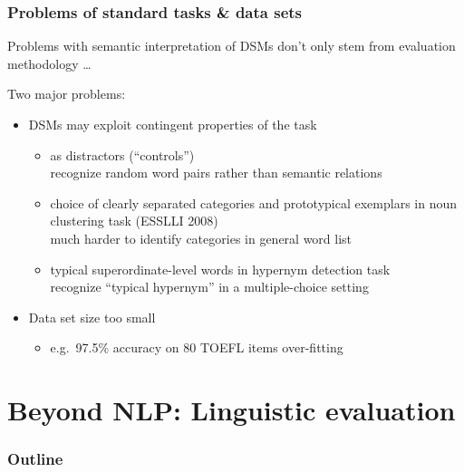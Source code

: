 \documentclass[t]{beamer} %
\begin{document}
\begin{frame}
  \frametitle{Problems of standard tasks \& data sets}

  Problems with semantic interpretation of DSMs don't only stem from evaluation methodology \ldots\\
  \hfill {} 
  
  \gap[1]
  Two major problems:
  \begin{itemize}
  \item DSMs may exploit contingent properties of the task
    \begin{itemize}
    \item {} as distractors (``controls'')\\
      \So recognize random word pairs rather than semantic relations
    \item choice of clearly separated categories and prototypical exemplars in noun clustering task (ESSLLI 2008)\\
      \So much harder to identify categories in general word list
    \item typical superordinate-level words in hypernym detection task\\
      \So recognize ``typical hypernym'' in a multiple-choice setting
    \end{itemize}
    \gap
  \item Data set size too small
    \begin{itemize}
    \item e.g.\ 97.5\% accuracy on 80 TOEFL items \so over-fitting
    \end{itemize}
  \end{itemize}
\end{frame}


\section{Beyond NLP: Linguistic evaluation}

\begin{frame}
  \frametitle{Outline}
  \tableofcontents[current]
\end{frame}
\end{document}
